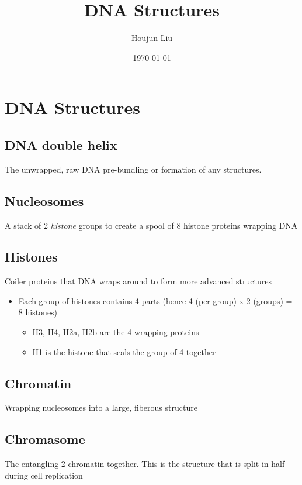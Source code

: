 \documentclass[letterpaper]{article}
\author{Houjun Liu}
\date{\today}
\title{DNA Structures}
\renewcommand{\tableofcontents}{}
\begin{document}
\tableofcontents



\section{DNA Structures}
\label{sec:org7e643a0}
\subsection{DNA double helix}
\label{sec:org6f4bfb4}
The unwrapped, raw DNA pre-bundling or formation of any structures.

\subsection{Nucleosomes}
\label{sec:orgbffe164}
A stack of 2 \emph{histone} groups to create a spool of 8 histone proteins
wrapping DNA

\subsection{Histones}
\label{sec:orgaeacebe}
Coiler proteins that DNA wraps around to form more advanced structures

\begin{itemize}
\item Each group of histones contains 4 parts (hence 4 (per group) x 2
(groups) = 8 histones)

\begin{itemize}
\item H3, H4, H2a, H2b are the 4 wrapping proteins
\item H1 is the histone that seals the group of 4 together
\end{itemize}
\end{itemize}

\subsection{Chromatin}
\label{sec:orgec5e758}
Wrapping nucleosomes into a large, fiberous structure

\subsection{Chromasome}
\label{sec:org2410e11}
The entangling 2 chromatin together. This is the structure that is split
in half during cell replication
\end{document}
